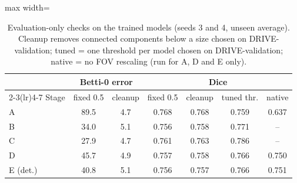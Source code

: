 \begin{table}[t]
\centering
\caption{Evaluation-only checks on the trained models (seeds 3 and 4, unseen average). Cleanup removes connected components below a size chosen on DRIVE-validation; tuned = one threshold per model chosen on DRIVE-validation; native = no FOV rescaling (run for A, D and E only).}
\label{tab:checks}
\small
\begin{adjustbox}{max width=\columnwidth}\begin{tabular}{l cc ccc c}
\toprule
 & \multicolumn{2}{c}{Betti-0 error} & \multicolumn{4}{c}{Dice} \\
\cmidrule(lr){2-3}\cmidrule(lr){4-7}
Stage & fixed 0.5 & cleanup & fixed 0.5 & cleanup & tuned thr. & native \\
\midrule
A & 89.5 & 4.7 & 0.768 & 0.768 & 0.759 & 0.637 \\
B & 34.0 & 5.1 & 0.756 & 0.758 & 0.771 & -- \\
C & 27.9 & 4.7 & 0.761 & 0.763 & 0.786 & -- \\
D & 45.7 & 4.9 & 0.757 & 0.758 & 0.766 & 0.750 \\
E (det.) & 40.8 & 5.1 & 0.756 & 0.757 & 0.766 & 0.751 \\
\bottomrule
\end{tabular}\end{adjustbox}
\end{table}
